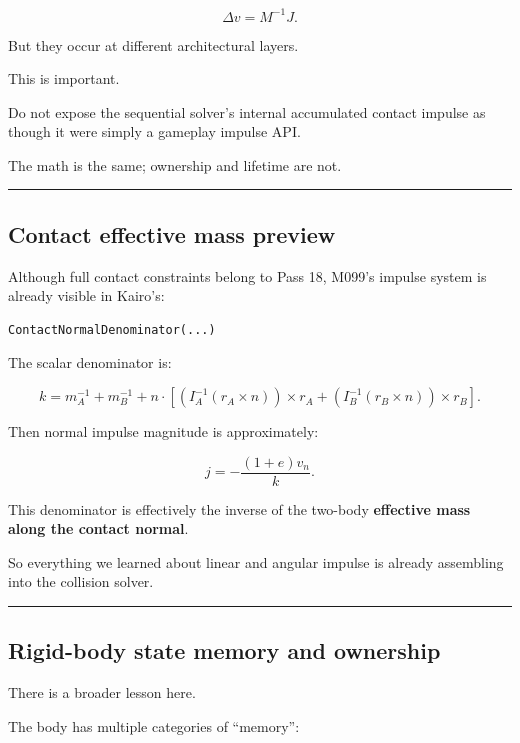 \[
\Delta v=M^{-1}J.
\]

But they occur at different architectural layers.

This is important.

Do not expose the sequential solver's internal accumulated contact impulse as though it were simply a gameplay impulse API.

The math is the same; ownership and lifetime are not.

\begin{center}\rule{0.5\linewidth}{0.5pt}\end{center}

\subsection{Contact effective mass preview}\label{06-engine-ii-ch037-contact-effective-mass-preview}

Although full contact constraints belong to Pass 18, M099's impulse system is already visible in Kairo's:

\begin{verbatim}
ContactNormalDenominator(...)
\end{verbatim}

The scalar denominator is:

\[
k
=
m_A^{-1}
+
m_B^{-1}
+
n\cdot
\left[
(I_A^{-1}(r_A\times n))\times r_A
+
(I_B^{-1}(r_B\times n))\times r_B
\right].
\]

Then normal impulse magnitude is approximately:

\[
\boxed{
j
=
-\frac{
(1+e)v_n
}{
k
}.
}
\]

This denominator is effectively the inverse of the two-body \textbf{effective mass along the contact normal}.

So everything we learned about linear and angular impulse is already assembling into the collision solver.

\begin{center}\rule{0.5\linewidth}{0.5pt}\end{center}

\subsection{Rigid-body state memory and ownership}\label{06-engine-ii-ch037-rigid-body-state-memory-and-ownership}

There is a broader lesson here.

The body has multiple categories of ``memory'':

